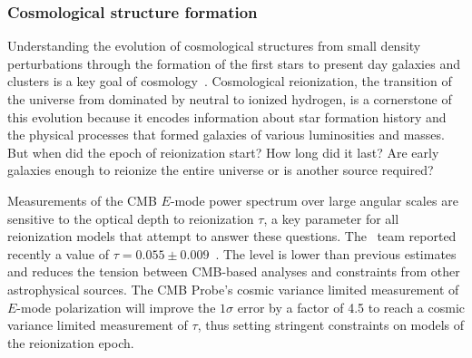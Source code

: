 
\vspace{-0.15in}

\subsubsection{Cosmological structure formation}

\vspace{-0.05in}

Understanding the evolution of cosmological structures from small density perturbations through the formation of the
first stars to present day galaxies and clusters is a key goal of cosmology~\cite{dunlop2011}. 
Cosmological reionization, the transition of the universe from dominated by neutral to ionized 
hydrogen, is a cornerstone of this evolution because it encodes information 
about star formation history and the physical processes that formed galaxies of various luminosities and masses. 
But when did the epoch of reionization start?  How long did it last? Are early galaxies enough to reionize the entire universe
or is another source required?
 
Measurements of the \ac{CMB} $E$-mode power spectrum over large angular scales are sensitive to the optical depth 
to reionization $\tau$, a key parameter for all reionization models that attempt to answer these questions. 
The \planck\ team  reported recently a value of $\tau=0.055 \pm 0.009$~\cite{planck2016_xlvi,planck2016_xxxi}.
The level is lower than previous estimates and reduces the tension between CMB-based analyses and constraints from 
other astrophysical sources.  
The CMB Probe's cosmic variance limited measurement of $E$-mode polarization will 
improve the $1\sigma$ error by a factor of 4.5 to reach a cosmic 
variance limited measurement of $\tau$, thus setting 
stringent constraints on models of the reionization epoch. 

